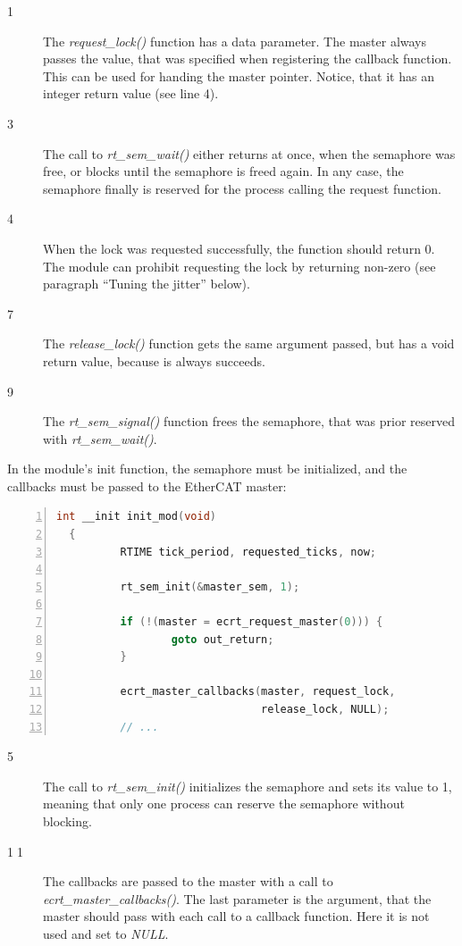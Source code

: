 \documentclass[a4paper,12pt,BCOR6mm,bibtotoc,idxtotoc]{scrbook}
\begin{document}
\begin{description}
\item[\normalfont\textcircled{\tiny 1}] The \textit{request\_lock()}
  function has a data parameter. The master always passes the value,
  that was specified when registering the callback function. This can
  be used for handing the master pointer. Notice, that it has an
  integer return value (see line 4).
\item[\normalfont\textcircled{\tiny 3}] The call to
  \textit{rt\_sem\_wait()} either returns at once, when the semaphore
  was free, or blocks until the semaphore is freed again. In any case,
  the semaphore finally is reserved for the process calling the
  request function.
\item[\normalfont\textcircled{\tiny 4}] When the lock was requested
  successfully, the function should return 0. The module can prohibit
  requesting the lock by returning non-zero (see paragraph ``Tuning
  the jitter'' below).
\item[\normalfont\textcircled{\tiny 7}] The \textit{release\_lock()}
  function gets the same argument passed, but has a void return value,
  because is always succeeds.
\item[\normalfont\textcircled{\tiny 9}] The \textit{rt\_sem\_signal()}
  function frees the semaphore, that was prior reserved with
  \textit{rt\_sem\_wait()}.
\end{description}

In the module's init function, the semaphore must be initialized, and
the callbacks must be passed to the EtherCAT master:

\begin{lstlisting}[language=C,numbers=left,caption={Module init
    function for concurrent access},label={lst:coninit}]
  int __init init_mod(void)
  {
          RTIME tick_period, requested_ticks, now;

          rt_sem_init(&master_sem, 1);

          if (!(master = ecrt_request_master(0))) {
                  goto out_return;
          }

          ecrt_master_callbacks(master, request_lock,
                                release_lock, NULL);
          // ...
\end{lstlisting}

\begin{description}
\item[\normalfont\textcircled{\tiny 5}] The call to
  \textit{rt\_sem\_init()} initializes the semaphore and sets its
  value to 1, meaning that only one process can reserve the semaphore
  without blocking.
\item[\normalfont\textcircled{\tiny 11}] The callbacks are passed to
  the master with a call to \textit{ecrt\_master\_callbacks()}. The
  last parameter is the argument, that the master should pass with
  each call to a callback function. Here it is not used and set to
  \textit{NULL}.
\end{description}
\end{document}
